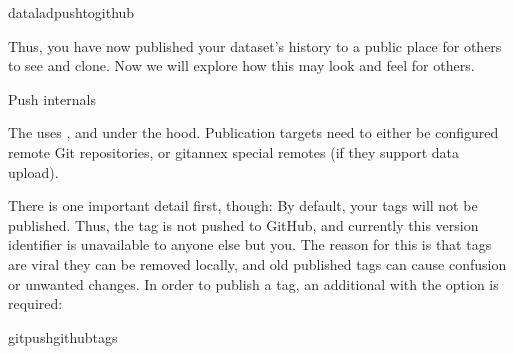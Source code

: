 \begin{sphinxVerbatim}[commandchars=\\\{\}]
dataladpush\PYGZhy{}\PYGZhy{}togithub
\end{sphinxVerbatim}

\sphinxAtStartPar
Thus, you have now published your dataset’s history to a public place for others
to see and clone. Now we will explore how this may look and feel for others.
\begin{gitusernote}[before title={\thetcbcounter\ }, check odd page=true]{Push internals}

\sphinxAtStartPar
The  uses , and  under
the hood. Publication targets need to either be configured remote Git repositories,
or git\sphinxhyphen{}annex special remotes (if they support data upload).


\end{gitusernote}

\sphinxAtStartPar
There is one important detail first, though: By default, your tags will not be published.
Thus, the tag  is not pushed to GitHub, and currently this
version identifier is unavailable to anyone else but you.
The reason for this is that tags are viral \textendash{} they can be removed locally, and old
published tags can cause confusion or unwanted changes. In order to publish a tag,
an additional   with the  option is required:

\ignorespaces 
\def\sphinxLiteralBlockLabel{\label{\detokenize{basics/101-130-yodaproject:index-17}}}
\begin{sphinxVerbatim}[commandchars=\\\{\}]
gitpushgithub\PYGZhy{}\PYGZhy{}tags
\end{sphinxVerbatim}

